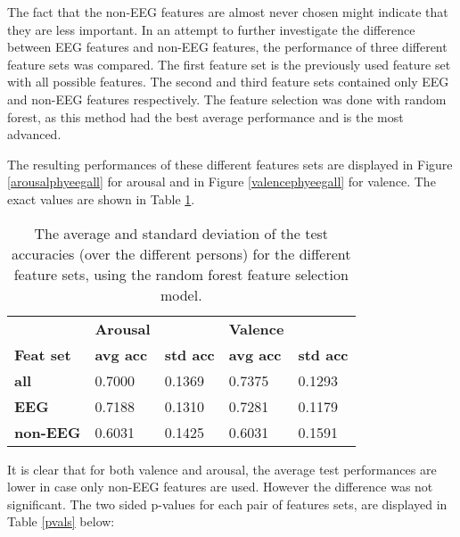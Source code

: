 The fact that the non-EEG features are almost never chosen might indicate that they are less important. In an attempt to further investigate the difference between EEG features and non-EEG features, the performance of three different feature sets was compared. The first feature set is the previously used feature set with all possible features. The second and third feature sets contained only EEG and non-EEG features respectively. The feature selection was done with random forest, as this method had the best average performance and is the most advanced. 

\npar

The resulting performances of these different features sets are displayed in Figure \ref{arousalphyeegall} for arousal and in Figure \ref{valencephyeegall} for valence. The exact values are shown in Table \ref{phyeegalltable}.



\begin{table}[H]
\centering
\caption{The average and standard deviation of the test accuracies (over the different persons) for the different feature sets, using the random forest feature selection model.\label{phyeegalltable}}
\begin{tabular}{l|ll|ll}
         & \textbf{Arousal} &         & \textbf{Valence} &         \\
\textbf{Feat set} & \textbf{avg acc} & \textbf{std acc} & \textbf{avg acc} & \textbf{std acc} \\ \hline 
\textbf{all}      & 0.7000  & 0.1369  & 0.7375  & 0.1293  \\
\textbf{EEG}      & 0.7188  & 0.1310  & 0.7281  & 0.1179  \\
\textbf{non-EEG}  & 0.6031  & 0.1425  & 0.6031  & 0.1591 
\end{tabular}
\end{table}

It is clear that for both valence and arousal, the average test performances are lower in case only non-EEG features are used. However the difference was not significant. The two sided p-values for each pair of features sets, are displayed in Table \ref{pvals} below:

